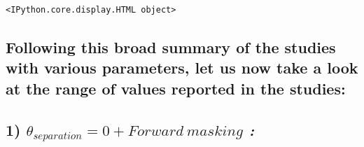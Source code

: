 \documentclass[11pt]{article}
\begin{document}
    
    \begin{verbatim}
<IPython.core.display.HTML object>
    \end{verbatim}

    
    \hypertarget{following-this-broad-summary-of-the-studies-with-various-parameters-let-us-now-take-a-look-at-the-range-of-values-reported-in-the-studies}{%
\subsection{Following this broad summary of the studies with various
parameters, let us now take a look at the range of values reported in
the
studies:}\label{following-this-broad-summary-of-the-studies-with-various-parameters-let-us-now-take-a-look-at-the-range-of-values-reported-in-the-studies}}

\hypertarget{theta_separation0-forward-masking}{%
\subsection{\texorpdfstring{1)
\emph{\(\theta_{separation}=0 + Forward\ masking\) :
}}{1) \textbackslash{}theta\_\{separation\}=0 + Forward\textbackslash{} masking : }}\label{theta_separation0-forward-masking}}
\end{document}
